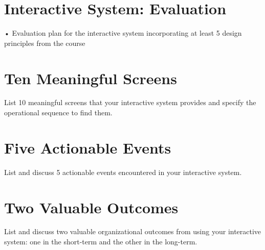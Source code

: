 \documentclass[11pt,fleqn]{book} %
\begin{document}

\chapter{Interactive System: Evaluation}
•	Evaluation plan for the interactive system incorporating at least 5 design principles from the course


\chapter{Ten Meaningful Screens}
List 10 meaningful screens that your interactive system provides and specify the operational sequence to find them.


\chapter{Five Actionable Events}
List and discuss 5 actionable events encountered in your interactive system.


\chapter{Two Valuable Outcomes}
List and discuss two valuable organizational outcomes from using your interactive system: one in the short-term and the other in the long-term. 




\vfill
\end{document}
